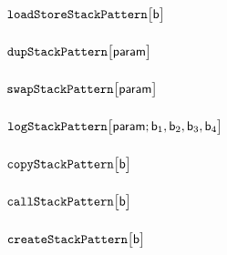 \subsubsection{\twoOneSP{} \lispDone{}}                                                                           \label{hub: stack patterns: 2_1}            
\subsubsection{\threeOneSP{} \lispDone{}}                                                                         \label{hub: stack patterns: 3_1}            
\subsubsection{$\texttt{loadStore}\texttt{StackPattern}\big[\textsf{b}\big]$ \lispDone{}}                                                       \label{hub: stack patterns: load store}     
\subsubsection{$\texttt{dup}\texttt{StackPattern}\big[\textsf{param}\big]$ \lispDone{}}                                                         \label{hub: stack patterns: dup}            
\subsubsection{$\texttt{swap}\texttt{StackPattern}\big[\textsf{param}\big]$ \lispDone{}}                                                        \label{hub: stack patterns: swap}           
\subsubsection{$\texttt{log}\texttt{StackPattern}\big[\textsf{param}; \textsf{b}_{1}, \textsf{b}_{2}, \textsf{b}_{3}, \textsf{b}_{4} \big]$ \lispDone{}}    \label{hub: stack patterns: log}            
\subsubsection{$\texttt{copy}\texttt{StackPattern}\big[\textsf{b}\big]$ \lispDone{}}                                                            \label{hub: stack patterns: copy}           
\subsubsection{$\texttt{call}\texttt{StackPattern}\big[\textsf{b}\big]$ \lispDone{}}                                                            \label{hub: stack patterns: call}           
\subsubsection{$\texttt{create}\texttt{StackPattern}\big[\textsf{b}\big]$ \lispDone{}}                                                          \label{hub: stack patterns: create}         
